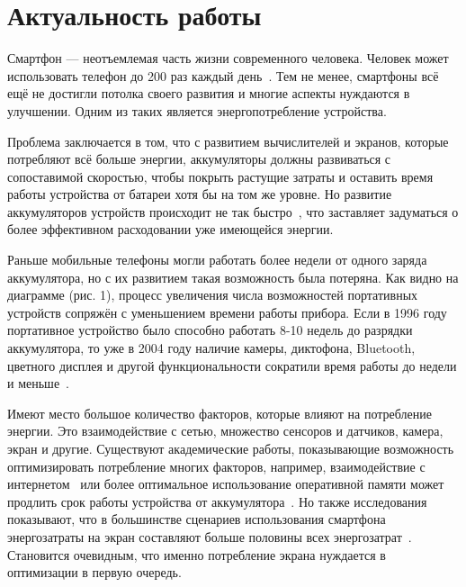 \documentclass[a4paper,14pt]{extarticle} %
\begin{document}
	
	
	\newpage
	\tableofcontents
	\newpage
	
	
	
	\newpage
	\section{Актуальность работы}
	
	Смартфон — неотъемлемая часть жизни современного человека. Человек может использовать телефон до 200 раз каждый день~\parencite{falaki2010diversity}. Тем не менее, смартфоны всё ещё не достигли потолка своего развития и многие аспекты нуждаются в улучшении. Одним из таких является энергопотребление устройства.
	
	Проблема заключается в том, что с развитием вычислителей и экранов, которые потребляют всё больше энергии, аккумуляторы должны развиваться с сопоставимой скоростью, чтобы покрыть растущие затраты и оставить время работы устройства от батареи хотя бы на том же уровне. Но развитие аккумуляторов устройств происходит не так быстро~\parencite{pentikousis2010search}, что заставляет задуматься о более эффективном расходовании уже имеющейся энергии.
	
	Раньше мобильные телефоны могли работать более недели от одного заряда аккумулятора, но с их развитием такая возможность была потеряна. Как видно на диаграмме (рис. 1), процесс увеличения числа возможностей портативных устройств сопряжён с уменьшением времени работы прибора. Если в 1996 году портативное устройство было способно работать 8-10 недель до разрядки аккумулятора, то уже в 2004 году наличие камеры, диктофона, Bluetooth, цветного дисплея и другой функциональности сократили время работы до недели и меньше~\parencite{василенко2005методы}.
	
	Имеют место большое количество факторов, которые влияют на потребление энергии. Это взаимодействие с сетью, множество сенсоров и датчиков, камера, экран и другие. Существуют академические работы, показывающие возможность оптимизировать потребление многих факторов, например, взаимодействие с интернетом~\parencite{tuysuz2019real} или более оптимальное использование оперативной памяти может продлить срок работы устройства от аккумулятора~\parencite{li2014investigation}. Но также исследования показывают, что в большинстве сценариев использования смартфона энергозатраты на экран составляют больше половины всех энергозатрат~\parencite{bai2013android}. Становится очевидным, что именно потребление экрана нуждается в оптимизации в первую очередь.
	
\end{document}
